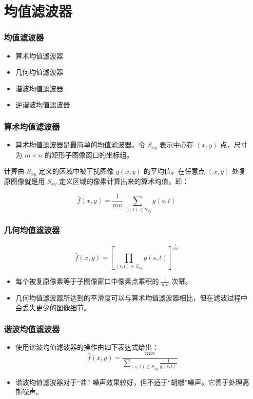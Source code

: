 \documentclass{beamer}
\begin{document}
\section{均值滤波器}
\label{sec-5}
\begin{frame}
\frametitle{均值滤波器}
\label{sec-5-1}

\begin{itemize}
\item 算术均值滤波器
\item 几何均值滤波器
\item 谐波均值滤波器
\item 逆谐波均值滤波器
\end{itemize}
\end{frame}
\begin{frame}
\frametitle{算术均值滤波器}
\label{sec-5-2}

\begin{itemize}
\item 算术均值滤波器是最简单的均值滤波器。令 $S_{xy}$ 表示中心在 $(x,y)$ 点，尺寸为 $m\times n$ 的矩形子图像窗口的坐标组。
\end{itemize}
计算由 $S_{xy}$ 定义的区域中被干扰图像 $g(x,y)$ 的平均值。在任意点 $(x,y)$ 处复原图像就是用 $S_{xy}$ 定义区域的像素计算出来的算术均值。即：

\[ \hat f(x,y) = \frac{1}{mn}\sum_{(s,t)\in S_{xy}}g(s,t) \]
\end{frame}
\begin{frame}
\frametitle{几何均值滤波器}
\label{sec-5-3}


\[ \hat f(x,y) = \left[\prod_{(s,t)\in S_{xy}}g(s,t)\right]^{\frac{1}{mn}} \]

\begin{itemize}
\item 每个被复原像素等于子图像窗口中像素点乘积的 $\frac{1}{mn}$ 次幂。
\item 几何均值滤波器所达到的平滑度可以与算术均值滤波器相比，但在滤波过程中会丢失更少的图像细节。
\end{itemize}
\end{frame}
\begin{frame}
\frametitle{谐波均值滤波器}
\label{sec-5-4}

\begin{itemize}
\item 使用谐波均值滤波器的操作由如下表达式给出：
   \[ \hat f(x,y) = \frac{mn}{\sum_{(s,t)\in S_{xy}}\frac{1}{g(s,t)}} \]
\item 谐波均值滤波器对于“盐” 噪声效果较好，但不适于“胡椒”噪声。它善于处理高斯噪声。
\end{itemize}
\end{frame}
\end{document}
